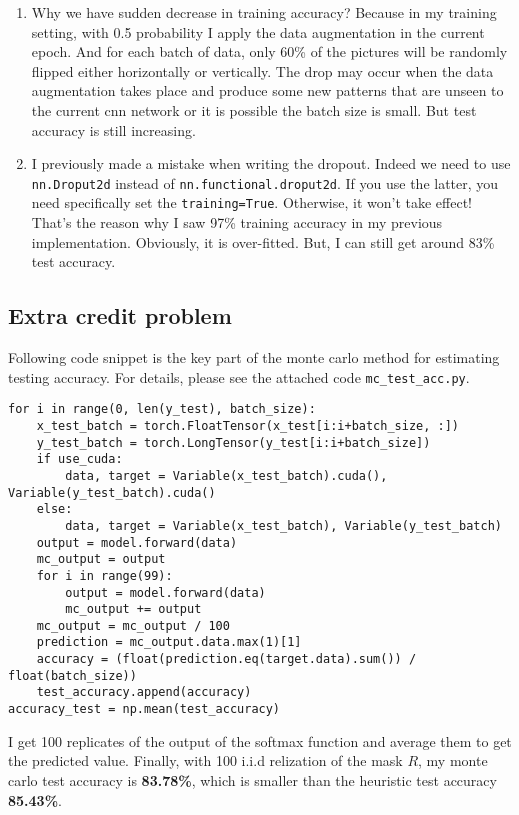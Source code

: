 \documentclass[11pt]{article}
\begin{document}
\begin{enumerate}
\def\labelenumi{\arabic{enumi}.}
\item
  Why we have sudden decrease in training accuracy? Because in my
  training setting, with 0.5 probability I apply the data augmentation
  in the current epoch. And for each batch of data, only 60\% of the
  pictures will be randomly flipped either horizontally or vertically.
  The drop may occur when the data augmentation takes place and produce
  some new patterns that are unseen to the current cnn network or it is
  possible the batch size is small. But test accuracy is still
  increasing.
\item
  I previously made a mistake when writing the dropout. Indeed we need
  to use \texttt{nn.Droput2d} instead of
  \texttt{nn.functional.droput2d}. If you use the latter, you need
  specifically set the \texttt{training=True}. Otherwise, it won't take
  effect! That's the reason why I saw 97\% training accuracy in my
  previous implementation. Obviously, it is over-fitted. But, I can
  still get around 83\% test accuracy.
\end{enumerate}

    \hypertarget{extra-credit-problem}{%
\subsection{Extra credit problem}\label{extra-credit-problem}}

Following code snippet is the key part of the monte carlo method for
estimating testing accuracy. For details, please see the attached code
\texttt{mc\_test\_acc.py}.

\begin{verbatim}
for i in range(0, len(y_test), batch_size):
    x_test_batch = torch.FloatTensor(x_test[i:i+batch_size, :])
    y_test_batch = torch.LongTensor(y_test[i:i+batch_size])
    if use_cuda:
        data, target = Variable(x_test_batch).cuda(), Variable(y_test_batch).cuda()
    else:
        data, target = Variable(x_test_batch), Variable(y_test_batch)
    output = model.forward(data)
    mc_output = output
    for i in range(99):
        output = model.forward(data)
        mc_output += output
    mc_output = mc_output / 100
    prediction = mc_output.data.max(1)[1]
    accuracy = (float(prediction.eq(target.data).sum()) / float(batch_size))
    test_accuracy.append(accuracy)
accuracy_test = np.mean(test_accuracy)
\end{verbatim}

    I get 100 replicates of the output of the softmax function and average
them to get the predicted value. Finally, with 100 i.i.d relization of
the mask \(R\), my monte carlo test accuracy is \textbf{83.78\%}, which
is smaller than the heuristic test accuracy \textbf{85.43\%}.


    
    
    
    
\end{document}
